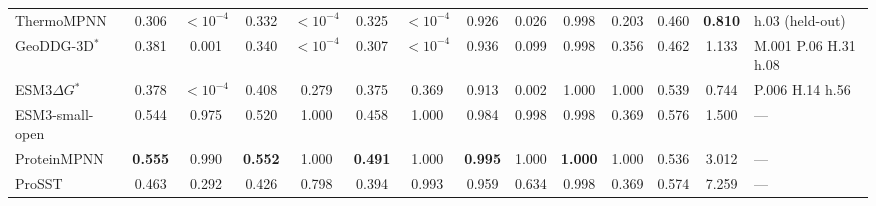\begin{table}[H]
{\begin{tabular}{lccccccccccccl}
ThermoMPNN & 0.306 & $<10^{-4}$ & 0.332 & $<10^{-4}$ & 0.325 & $<10^{-4}$ & 0.926 & 0.026 & 0.998 & 0.203 & 0.460 & \textbf{0.810} & h.03 (held-out) \\
GeoDDG-3D$^*$ & 0.381 & 0.001 & 0.340 & $<10^{-4}$ & 0.307 & $<10^{-4}$ & 0.936 & 0.099 & 0.998 & 0.356 & 0.462 & 1.133 & M.001 P.06 H.31 h.08 \\
ESM3$\Delta G$$^*$ & 0.378 & $<10^{-4}$ & 0.408 & 0.279 & 0.375 & 0.369 & 0.913 & 0.002 & 1.000 & 1.000 & 0.539 & 0.744 & P.006 H.14 h.56 \\
ESM3-small-open & 0.544 & 0.975 & 0.520 & 1.000 & 0.458 & 1.000 & 0.984 & 0.998 & 0.998 & 0.369 & 0.576 & 1.500 & --- \\
ProteinMPNN & \textbf{0.555} & 0.990 & \textbf{0.552} & 1.000 & \textbf{0.491} & 1.000 & \textbf{0.995} & 1.000 & \textbf{1.000} & 1.000 & 0.536 & 3.012 & --- \\
ProSST & 0.463 & 0.292 & 0.426 & 0.798 & 0.394 & 0.993 & 0.959 & 0.634 & 0.998 & 0.369 & 0.574 & 7.259 & --- \\
\bottomrule
\end{tabular}
}
\end{table}

